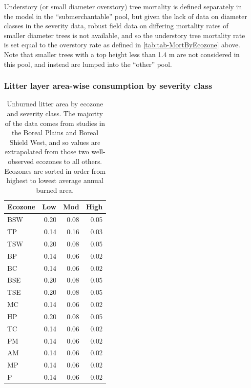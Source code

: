 \documentclass[, manuscript]{copernicus}
\begin{document}
Understory (or small diameter overstory) tree mortality is defined
separately in the model in the ``submerchantable'' pool, but given the
lack of data on diameter classes in the severity data, robust field data
on differing mortality rates of smaller diameter trees is not available,
and so the understory tree mortality rate is set equal to the overstory
rate as defined in \ref{tab:tab-MortByEcozone} above. Note that smaller
trees with a top height less than 1.4 m are not considered in this pool,
and instead are lumped into the ``other'' pool.

\subsubsection{Litter layer area-wise consumption by severity class}

\begin{table}
\centering
\caption{\label{tab:tab-UnBurnedForestFloorByEcozone}Unburned litter area by ecozone and severity class.  The majority of the data comes from studies in the Boreal Plains and Boreal Shield West, and so values are extrapolated from those two well-observed ecozones to all others.  Ecozones are sorted in order from highest to lowest average annual burned area.}
\centering
\begin{tabular}[t]{l|r|r|r}
\hline
Ecozone & Low & Mod & High\\
\hline
BSW & 0.20 & 0.08 & 0.05\\
\hline
TP & 0.14 & 0.16 & 0.03\\
\hline
TSW & 0.20 & 0.08 & 0.05\\
\hline
BP & 0.14 & 0.06 & 0.02\\
\hline
BC & 0.14 & 0.06 & 0.02\\
\hline
BSE & 0.20 & 0.08 & 0.05\\
\hline
TSE & 0.20 & 0.08 & 0.05\\
\hline
MC & 0.14 & 0.06 & 0.02\\
\hline
HP & 0.20 & 0.08 & 0.05\\
\hline
TC & 0.14 & 0.06 & 0.02\\
\hline
PM & 0.14 & 0.06 & 0.02\\
\hline
AM & 0.14 & 0.06 & 0.02\\
\hline
MP & 0.14 & 0.06 & 0.02\\
\hline
P & 0.14 & 0.06 & 0.02\\
\hline
\end{tabular}
\end{table}
\end{document}
